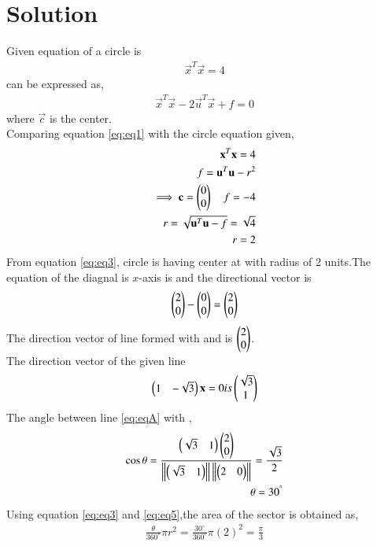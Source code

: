 \documentclass[journal,12pt,twocolumn]{IEEEtran}
\newcommand{\norm}[1]{\left\lVert#1\right\rVert}
\begin{document}
\section{Solution}
Given equation of a circle is 
    \begin{align}
        \vec{x}^{T} \vec{x} =4 \label{eq:A}
    \end{align}
can be expressed as,
\begin{align}
    \vec{x}^{T}\vec{x} - 2\vec{u}^{T}\vec{x} +f=0 \label{eq:eq1}
\end{align}
where $\vec{c}$ is the center.\\
Comparing equation \eqref{eq:eq1} with the circle equation given,
\begin{align}
    \mathbf{x}^{T}\mathbf{x} =4 \label{eq:eq2}\\
    \quad f = \mathbf{u}^T \mathbf{u}-r^2 \\
    \implies \mathbf{c} = \begin{pmatrix}0\\0\end{pmatrix} \quad f=-4\\
    r=\sqrt{\mathbf{u}^{T}\mathbf{u}-f} = \sqrt{4}\\
    r=2 \label{eq:eq3}
\end{align}
From equation \eqref{eq:eq3}, circle is having center at  with radius of 2 units.The equation of the diagnal is  $x$-axis is and the directional vector is 
\begin{align}
    \begin{pmatrix}2 \\ 0\end{pmatrix} - \begin{pmatrix}0 \\ 0\end{pmatrix} = \begin{pmatrix}2 \\ 0\end{pmatrix}    
\end{align}
The direction vector of line formed with  and  is  $\begin{pmatrix}2\\0\end{pmatrix}$.\\
The direction vector of the given line 
\begin{align}
    \begin{pmatrix}1&-\sqrt{3}\end{pmatrix}\mathbf{x}=0 is \begin{pmatrix}\sqrt{3}\\1\end{pmatrix} \label{eq:eqA}
\end{align}
The angle between line \eqref{eq:eqA} with  ,
\begin{align}
    \cos\theta = \frac{\myvec{\sqrt{3}&1}\myvec{2\\0}}{\norm{\myvec{\sqrt{3}&1}}\norm{\myvec{2&0}}}=\frac{\sqrt{3}}{2} \label{eq:solutions/7/eq:eq4}\\
    \theta = 30^{\degree}\label{eq:eq5}
\end{align}
Using equation \eqref{eq:eq3} and \eqref{eq:eq5},the area of the sector is obtained as,
\begin{align}
    \frac{\theta}{360^{\circ}}\pi r^2 = \frac{30^{\circ}}{360^{\circ}}\pi (2)^2=\frac{\pi}{3} \label{eq:eq6}
\end{align}
\end{document}
